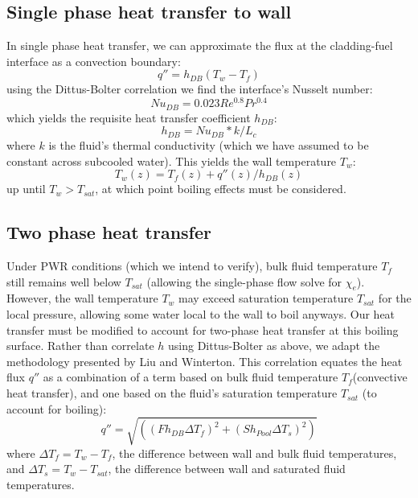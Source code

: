 \documentclass[12pt]{article}
\begin{document}
\subsection{Single phase heat transfer to wall}
In single phase heat transfer, we can approximate the flux at the cladding-fuel interface as a convection boundary:
\newcommand{\hDB}{\ensuremath{h_{DB}}}
\begin{equation}
    \label{eq:q_1p}
    q''=\hDB(T_w-T_f)
\end{equation}
using the Dittus-Bolter correlation\cite{bergman_fundamentals_2017} we find the interface's Nusselt number:
\begin{equation}
    Nu_{DB} = 0.023 Re^{0.8}Pr^{0.4}
\end{equation}
which yields the requisite heat transfer coefficient $\hDB$:
\begin{equation}
    \label{eq:hdb}
    \hDB = Nu_{DB} * k / L_c
\end{equation}
where $k$ is the fluid's thermal conductivity (which we have assumed to be constant across subcooled water).
This yields the wall temperature $T_w$:
\begin{equation}
    \label{eq:Tw_db}
    T_w(z) = T_f(z) + q''(z)/h_{DB}(z)
\end{equation}
up until $T_w>T_{sat}$, at which point boiling effects must be considered.
\subsection{Two phase heat transfer}
Under PWR conditions (which we intend to verify), bulk fluid temperature $T_f$ still remains well below $T_{sat}$ (allowing the single-phase flow solve for $\chi_e$).
However, the wall temperature $T_w$ may exceed saturation temperature $T_{sat}$ for the local pressure, allowing some water local to the wall to boil anyways.
Our heat transfer must be modified to account for two-phase heat transfer at this boiling surface.
Rather than correlate $h$ using Dittus-Bolter as above, we adapt the methodology presented by Liu and Winterton\cite{liu_general_1991}.
This correlation equates the heat flux $q''$ as a combination of a term based on bulk fluid temperature $T_f$(convective heat transfer), and one based on the fluid's saturation temperature $T_{sat}$ (to account for boiling):
\begin{equation}
    \label{eq:LW-flux}
    q'' = \sqrt{\left(
        \left(Fh_{DB}\Delta T_f\right)^2 + 
        \left(Sh_{Pool}\Delta T_s\right)^2
    \right)}
\end{equation}
where $\Delta T_f=T_w-T_f$, the difference between wall and bulk fluid temperatures, and $\Delta T_s=T_w-T_{sat}$, the difference between wall and saturated fluid temperatures.\\
\end{document}
